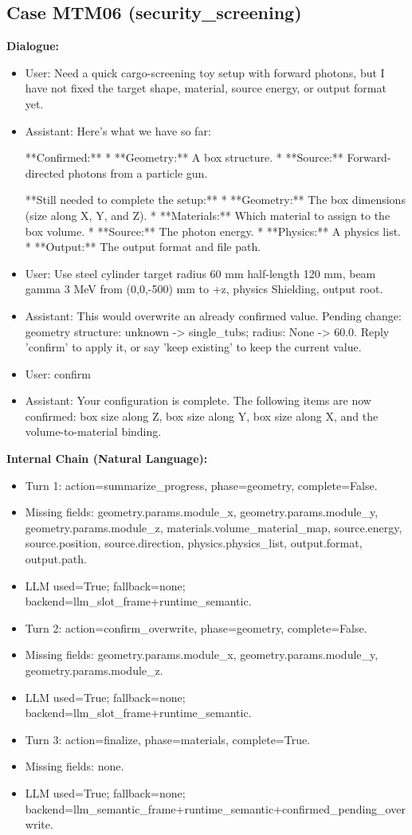 \documentclass[11pt]{ctexart}
\begin{document}
\subsection{Case MTM06 (security\_screening)}
\textbf{Dialogue:}
\begin{itemize}
\item User: Need a quick cargo-screening toy setup with forward photons, but I have not fixed the target shape, material, source energy, or output format yet.
\item Assistant: Here's what we have so far:

**Confirmed:**
*   **Geometry:** A box structure.
*   **Source:** Forward-directed photons from a particle gun.

**Still needed to complete the setup:**
*   **Geometry:** The box dimensions (size along X, Y, and Z).
*   **Materials:** Which material to assign to the box volume.
*   **Source:** The photon energy.
*   **Physics:** A physics list.
*   **Output:** The output format and file path.
\item User: Use steel cylinder target radius 60 mm half-length 120 mm, beam gamma 3 MeV from (0,0,-500) mm to +z, physics Shielding, output root.
\item Assistant: This would overwrite an already confirmed value. Pending change: geometry structure: unknown -> single\_tubs; radius: None -> 60.0. Reply 'confirm' to apply it, or say 'keep existing' to keep the current value.
\item User: confirm
\item Assistant: Your configuration is complete. The following items are now confirmed: box size along Z, box size along Y, box size along X, and the volume-to-material binding.
\end{itemize}
\textbf{Internal Chain (Natural Language):}
\begin{itemize}
\item Turn 1: action=summarize\_progress, phase=geometry, complete=False.
\item Missing fields: geometry.params.module\_x, geometry.params.module\_y, geometry.params.module\_z, materials.volume\_material\_map, source.energy, source.position, source.direction, physics.physics\_list, output.format, output.path.
\item LLM used=True; fallback=none; backend=llm\_slot\_frame+runtime\_semantic.
\item Turn 2: action=confirm\_overwrite, phase=geometry, complete=False.
\item Missing fields: geometry.params.module\_x, geometry.params.module\_y, geometry.params.module\_z.
\item LLM used=True; fallback=none; backend=llm\_slot\_frame+runtime\_semantic.
\item Turn 3: action=finalize, phase=materials, complete=True.
\item Missing fields: none.
\item LLM used=True; fallback=none; backend=llm\_semantic\_frame+runtime\_semantic+confirmed\_pending\_overwrite.
\end{itemize}
\end{document}
